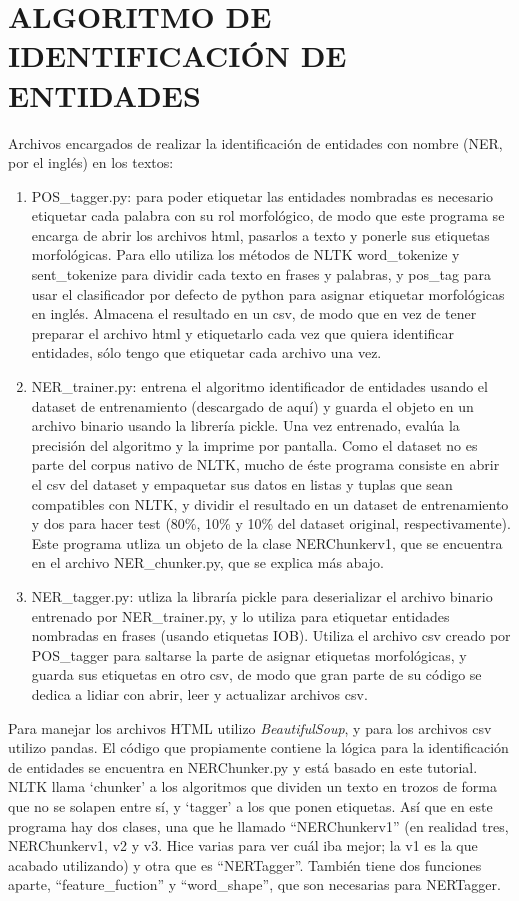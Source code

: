 \documentclass{pre-tfg}
\begin{document}
\section{ALGORITMO DE IDENTIFICACIÓN DE ENTIDADES}
Archivos encargados de realizar la identificación de entidades con nombre (NER, por el inglés) en los textos:
\begin{enumerate}
	\item POS\_tagger.py: para poder etiquetar las entidades nombradas es necesario etiquetar cada palabra con su rol morfológico, de modo que este programa se encarga de abrir los archivos html, pasarlos a texto y ponerle sus etiquetas morfológicas. Para ello utiliza los métodos de NLTK word\_tokenize y sent\_tokenize para dividir cada texto en frases y palabras, y pos\_tag para usar el clasificador por defecto de python para asignar etiquetar morfológicas en inglés. Almacena el resultado en un csv, de modo que en vez de tener preparar el archivo html y etiquetarlo cada vez que quiera identificar entidades, sólo tengo que etiquetar cada archivo una vez.
	\item NER\_trainer.py: entrena el algoritmo identificador de entidades usando el dataset de entrenamiento (descargado de aquí) y guarda el objeto en un archivo binario usando la librería pickle. Una vez entrenado, evalúa la precisión del algoritmo y la imprime por pantalla. Como el dataset no es parte del corpus nativo de NLTK, mucho de éste programa consiste en abrir el csv del dataset y empaquetar sus datos en listas y tuplas que sean compatibles con NLTK, y dividir el resultado en un dataset de entrenamiento y dos para hacer test (80\%, 10\% y 10\% del dataset original, respectivamente). Este programa utliza un objeto de la clase NERChunkerv1, que se encuentra en el archivo NER\_chunker.py, que se explica más abajo.
	\item NER\_tagger.py: utliza la libraría pickle para deserializar el archivo binario entrenado por NER\_trainer.py, y lo utiliza para etiquetar entidades nombradas en frases (usando etiquetas IOB). Utiliza el archivo csv creado por POS\_tagger para saltarse la parte de asignar etiquetas morfológicas, y guarda sus etiquetas en otro csv, de modo que gran parte de su código se dedica a lidiar con abrir, leer y actualizar archivos csv.
\end{enumerate}


Para manejar los archivos HTML utilizo \textit{BeautifulSoup}, y para los archivos csv utilizo pandas.
El código que propiamente contiene la lógica para la identificación de entidades se encuentra en NERChunker.py y está basado en este tutorial. NLTK llama ‘chunker’ a los algoritmos que dividen un texto en trozos de forma que no se solapen entre sí, y ‘tagger’ a los que ponen etiquetas. Así que en este programa hay dos clases, una que he llamado “NERChunkerv1” (en realidad tres, NERChunkerv1, v2 y v3. Hice varias para ver cuál iba mejor; la v1 es la que acabado utilizando) y otra que es “NERTagger”. También tiene dos funciones aparte, “feature\_fuction” y “word\_shape”, que son necesarias para NERTagger.
\end{document}
